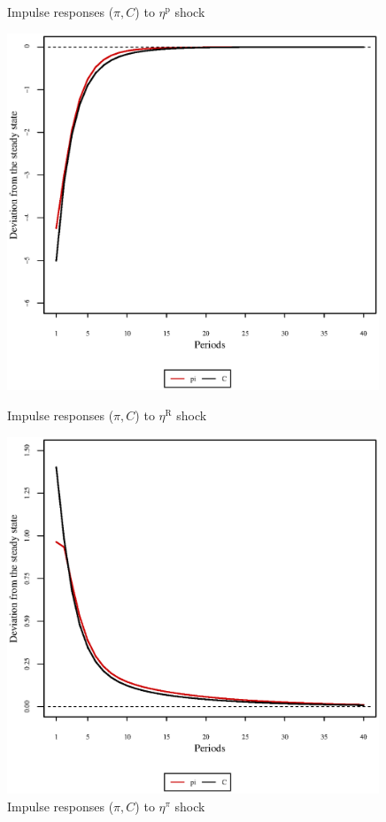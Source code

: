 \begin{figure}[h]
\begin{minipage}{0.5\textwidth}
\caption{Impulse responses ($\pi, C$) to $\eta^{\mathrm{p}}$ shock}
\end{minipage}
\end{figure}

\begin{figure}[h]
\begin{minipage}{0.5\textwidth}
\vspace*{-3em}
\centering
\includegraphics[width=0.99\textwidth, scale=0.55]{plots/plot_28.eps}
\caption{Impulse responses ($\pi, C$) to $\eta^{\mathrm{R}}$ shock}
\end{minipage}
\begin{minipage}{0.5\textwidth}
\vspace*{-3em}
\centering
\includegraphics[width=0.99\textwidth, scale=0.55]{plots/plot_29.eps}
\caption{Impulse responses ($\pi, C$) to $\eta^{\pi}$ shock}
\end{minipage}
\end{figure}

